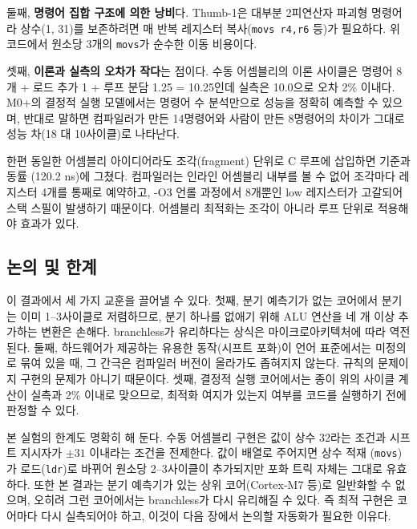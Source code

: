 둘째, \textbf{명령어 집합 구조에 의한 낭비}다. Thumb-1은 대부분 2피연산자 파괴형 명령어라
상수(1, 31)를 보존하려면 매 반복 레지스터 복사(\texttt{movs r4,r6} 등)가 필요하다. 위
코드에서 원소당 3개의 \texttt{movs}가 순수한 이동 비용이다.

셋째, \textbf{이론과 실측의 오차가 작다}는 점이다. 수동 어셈블리의 이론 사이클은 명령어
8개 + 로드 추가 1 + 루프 분담 1.25 = 10.25인데 실측은 10.0으로 오차 2\% 이내다. M0+의
결정적 실행 모델에서는 명령어 수 분석만으로 성능을 정확히 예측할 수 있으며, 반대로 말하면
컴파일러가 만든 14명령어와 사람이 만든 8명령어의 차이가 그대로 성능 차(18 대 10사이클)로
나타난다.

한편 동일한 어셈블리 아이디어라도 조각(fragment) 단위로 C 루프에 삽입하면 기준과 동률
(120.2 ns)에 그쳤다. 컴파일러는 인라인 어셈블리 내부를 볼 수 없어 조각마다 레지스터 4개를
통째로 예약하고, -O3 언롤 과정에서 8개뿐인 low 레지스터가 고갈되어 스택 스필이 발생하기
때문이다. 어셈블리 최적화는 조각이 아니라 루프 단위로 적용해야 효과가 있다.

\subsection{논의 및 한계}

이 결과에서 세 가지 교훈을 끌어낼 수 있다. 첫째, 분기 예측기가 없는 코어에서 분기는 이미
1--3사이클로 저렴하므로, 분기 하나를 없애기 위해 ALU 연산을 네 개 이상 추가하는 변환은
손해다. branchless가 유리하다는 상식은 마이크로아키텍처에 따라 역전된다. 둘째, 하드웨어가
제공하는 유용한 동작(시프트 포화)이 언어 표준에서는 미정의로 묶여 있을 때, 그 간극은 컴파일러
버전이 올라가도 좁혀지지 않는다. 규칙의 문제이지 구현의 문제가 아니기 때문이다. 셋째,
결정적 실행 코어에서는 종이 위의 사이클 계산이 실측과 2\% 이내로 맞으므로, 최적화 여지가
있는지 여부를 코드를 실행하기 전에 판정할 수 있다.

본 실험의 한계도 명확히 해 둔다. 수동 어셈블리 구현은 값이 상수 32라는 조건과 시프트
지시자가 $\pm 31$ 이내라는 조건을 전제한다. 값이 배열로 주어지면 상수 적재
(\texttt{movs})가 로드(\texttt{ldr})로 바뀌어 원소당 2--3사이클이 추가되지만 포화 트릭
자체는 그대로 유효하다. 또한 본 결과는 분기 예측기가 있는 상위 코어(Cortex-M7 등)로
일반화할 수 없으며, 오히려 그런 코어에서는 branchless가 다시 유리해질 수 있다. 즉 최적
구현은 코어마다 다시 실측되어야 하고, 이것이 다음 장에서 논의할 자동화가 필요한 이유다.

